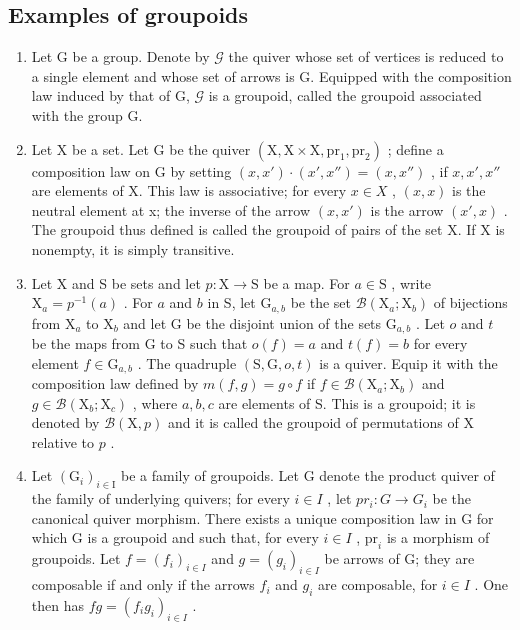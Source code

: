 \subsection{Examples of groupoids}

\begin{enumerate}
\def\labelenumi{\arabic{enumi})}
\item
  Let G be a group. Denote by \(\mathcal{G}\) the quiver whose set of vertices is reduced to a single element and whose set of arrows is G. Equipped with the composition law induced by that of G, \(\mathcal{G}\) is a groupoid, called the groupoid associated with the group G.
\item
  Let X be a set. Let G be the quiver \((\mathrm{X}, \mathrm{X} \times \mathrm{X}, \mathrm{pr}_{1}, \mathrm{pr}_{2})\) ; define a composition law on G by setting \((x, x') \cdot (x', x'') = (x, x'')\) , if \(x, x', x''\) are elements of X. This law is associative; for every \(x \in X\) , \((x, x)\) is the neutral element at x; the inverse of the arrow \((x, x')\) is the arrow \((x', x)\) . The groupoid thus defined is called the groupoid of pairs of the set X. If X is nonempty, it is simply transitive.
\item
  Let X and S be sets and let \(p \colon \mathrm{X} \to \mathrm{S}\) be a map. For \(a \in \mathrm{S}\) , write \(\mathrm{X}_a = p^{-1}(a)\) . For \(a\) and \(b\) in S, let \(\mathrm{G}_{a,b}\) be the set \(\mathcal{B}(\mathrm{X}_a; \mathrm{X}_b)\) of bijections from \(\mathrm{X}_a\) to \(\mathrm{X}_b\) and let G be the disjoint union of the sets \(\mathrm{G}_{a,b}\) . Let \(o\) and \(t\) be the maps from G to S such that \(o(f) = a\) and \(t(f) = b\) for every element \(f \in \mathrm{G}_{a,b}\) . The quadruple \((\mathrm{S}, \mathrm{G}, o, t)\) is a quiver. Equip it with the composition law defined by \(m(f, g) = g \circ f\) if \(f \in \mathcal{B}(\mathrm{X}_a; \mathrm{X}_b)\) and \(g \in \mathcal{B}(\mathrm{X}_b; \mathrm{X}_c)\) , where \(a, b, c\) are elements of S. This is a groupoid; it is denoted by \(\mathcal{B}(\mathrm{X}, p)\) and it is called the groupoid of permutations of X relative to \(p\) .
\item
  Let \((\mathrm{G}_{i})_{i\in\mathrm{I}}\) be a family of groupoids. Let G denote the product quiver of the family of underlying quivers; for every \(i\in I\) , let \(pr_{i}\colon G\to G_{i}\) be the canonical quiver morphism. There exists a unique composition law in G for which G is a groupoid and such that, for every \(i \in I\) , \(\mathrm{pr}_i\) is a morphism of groupoids. Let \(f = (f_i)_{i \in I}\) and \(g = (g_i)_{i \in I}\) be arrows of G; they are composable if and only if the arrows \(f_i\) and \(g_i\) are composable, for \(i \in I\) . One then has \(fg = (f_i g_i)_{i \in I}\) .
\end{enumerate}

